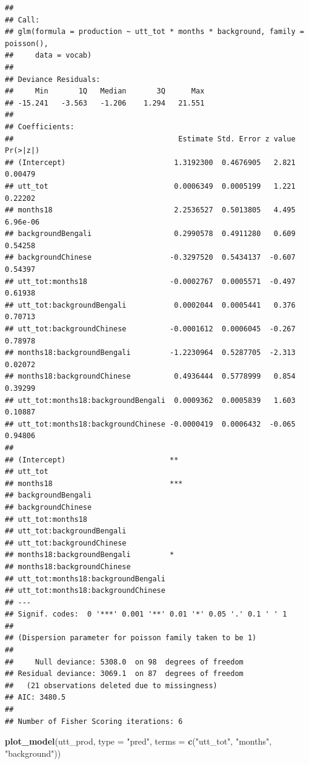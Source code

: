 \documentclass[]{article}
\newenvironment{Shaded}{\begin{snugshade}}{\end{snugshade}}
\newcommand{\DataTypeTok}[1]{\textcolor[rgb]{0.13,0.29,0.53}{#1}}
\newcommand{\KeywordTok}[1]{\textcolor[rgb]{0.13,0.29,0.53}{\textbf{#1}}}
\newcommand{\NormalTok}[1]{#1}
\newcommand{\StringTok}[1]{\textcolor[rgb]{0.31,0.60,0.02}{#1}}
\begin{document}
\begin{verbatim}
## 
## Call:
## glm(formula = production ~ utt_tot * months * background, family = poisson(), 
##     data = vocab)
## 
## Deviance Residuals: 
##     Min       1Q   Median       3Q      Max  
## -15.241   -3.563   -1.206    1.294   21.551  
## 
## Coefficients:
##                                      Estimate Std. Error z value Pr(>|z|)
## (Intercept)                         1.3192300  0.4676905   2.821  0.00479
## utt_tot                             0.0006349  0.0005199   1.221  0.22202
## months18                            2.2536527  0.5013805   4.495 6.96e-06
## backgroundBengali                   0.2990578  0.4911280   0.609  0.54258
## backgroundChinese                  -0.3297520  0.5434137  -0.607  0.54397
## utt_tot:months18                   -0.0002767  0.0005571  -0.497  0.61938
## utt_tot:backgroundBengali           0.0002044  0.0005441   0.376  0.70713
## utt_tot:backgroundChinese          -0.0001612  0.0006045  -0.267  0.78978
## months18:backgroundBengali         -1.2230964  0.5287705  -2.313  0.02072
## months18:backgroundChinese          0.4936444  0.5778999   0.854  0.39299
## utt_tot:months18:backgroundBengali  0.0009362  0.0005839   1.603  0.10887
## utt_tot:months18:backgroundChinese -0.0000419  0.0006432  -0.065  0.94806
##                                       
## (Intercept)                        ** 
## utt_tot                               
## months18                           ***
## backgroundBengali                     
## backgroundChinese                     
## utt_tot:months18                      
## utt_tot:backgroundBengali             
## utt_tot:backgroundChinese             
## months18:backgroundBengali         *  
## months18:backgroundChinese            
## utt_tot:months18:backgroundBengali    
## utt_tot:months18:backgroundChinese    
## ---
## Signif. codes:  0 '***' 0.001 '**' 0.01 '*' 0.05 '.' 0.1 ' ' 1
## 
## (Dispersion parameter for poisson family taken to be 1)
## 
##     Null deviance: 5308.0  on 98  degrees of freedom
## Residual deviance: 3069.1  on 87  degrees of freedom
##   (21 observations deleted due to missingness)
## AIC: 3480.5
## 
## Number of Fisher Scoring iterations: 6
\end{verbatim}

\begin{Shaded}
\begin{Highlighting}[]
\KeywordTok{plot_model}\NormalTok{(utt_prod, }\DataTypeTok{type =} \StringTok{"pred"}\NormalTok{, }\DataTypeTok{terms =} \KeywordTok{c}\NormalTok{(}\StringTok{"utt_tot"}\NormalTok{, }\StringTok{"months"}\NormalTok{, }\StringTok{"background"}\NormalTok{))}
\end{Highlighting}
\end{Shaded}
\end{document}
